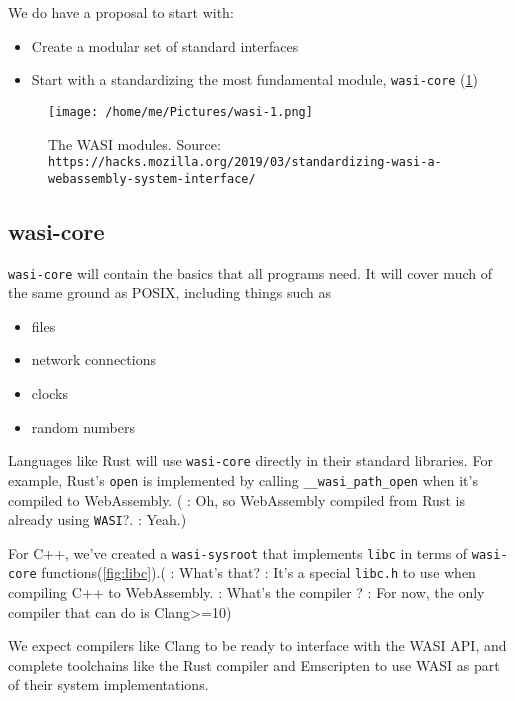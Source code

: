 \documentclass[dvipsnames]{article}
\newcommand{\mycolb}{Mahogany}
\newcommand{\colb}[1]{\textcolor{\mycolb}{#1}}
\begin{document}
We do have a proposal to start with:

\begin{itemize}
\item Create a modular set of standard interfaces
\item Start with a standardizing the most fundamental module, \texttt{wasi-core}
  (\cref{fig:wasi-1})
\end{itemize}

\begin{figure}[ht]
  \centering
  \texttt{[image: /home/me/Pictures/wasi-1.png]}
  \caption{The WASI modules. Source:
    \texttt{https://hacks.mozilla.org/2019/03/standardizing-wasi-a-webassembly-system-interface/}}
  \label{fig:wasi-1}
\end{figure}

\subsection{wasi-core}

\texttt{wasi-core} will contain the basics that all programs need. It will cover
much of the same ground as POSIX, including things such as
\begin{itemize}
\item files
\item network connections
\item clocks
\item random numbers
\end{itemize}

Languages like Rust will use \texttt{wasi-core} directly in their standard
libraries. For example, Rust's \texttt{open} is implemented by calling
\verb|__wasi_path_open| when it's compiled to WebAssembly. ( : Oh,
so WebAssembly compiled from Rust is already using \texttt{WASI}?.
: Yeah.)

For C++, we've created a \texttt{wasi-sysroot} that implements \texttt{libc} in
terms of \texttt{wasi-core} functions(\cref{fig:libc}).( : What's that?
 : It's a special \texttt{libc.h} to use when compiling C++ to
WebAssembly.  : What's the compiler ? : For now, the
only compiler that can do is Clang>=10)

We expect compilers like Clang to be ready to interface with the WASI API, and
\colb{complete toolchains} like the \colb{Rust compiler and Emscripten} to use WASI as part of their system implementations.
\end{document}
